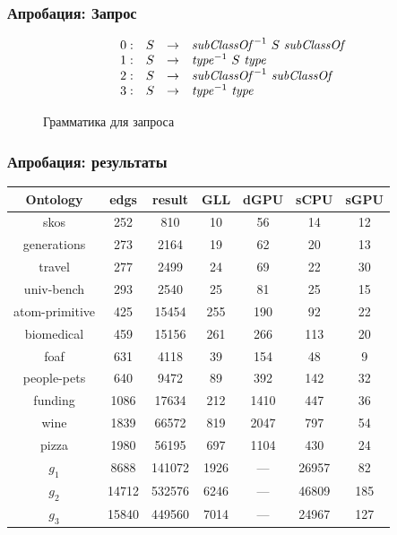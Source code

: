 \documentclass{beamer}
\begin{document}
\begin{frame}[fragile]
	\transwipe[direction=90]
	\frametitle{Апробация: Запрос}
\begin{figure}[h]
   \[
\begin{array}{rccl}
   0: & S & \rightarrow & \text{\textit{subClassOf}}^{-1} \ S \ \text{\textit{subClassOf}} \\ 
   1: & S & \rightarrow & \text{\textit{type}}^{-1} \ S \ \text{\textit{type}} \\ 
   2: & S & \rightarrow & \text{\textit{subClassOf}}^{-1} \ \text{\textit{subClassOf}} \\ 
   3: & S & \rightarrow & \text{\textit{type}}^{-1} \ \text{\textit{type}} \\ 
\end{array}
\]
\caption{Грамматика для запроса}
\label{ProductionRulesQuery1}
\end{figure}
\end{frame}

\begin{frame}[fragile]
  \transwipe[direction=90]
  \frametitle{Апробация: результаты}
\begin{center}
\begin{tabular}{ | c | c | c | c | c | c | c |}
\hline
Ontology & edgs & result & GLL & dGPU & sCPU & sGPU \\
\hline 
\hline
skos        & 252 & 810 & 10 & 56 & 14 & 12\\
generations & 273 & 2164 & 19 & 62 & 20 & 13\\
travel      & 277 & 2499 & 24 & 69 & 22 & 30\\
univ-bench  & 293 & 2540 & 25 & 81 & 25 & 15\\
atom-primitive & 425 & 15454 & 255 & 190 & 92 & 22\\
biomedical & 459 & 15156 & 261 & 266 & 113 & 20\\
foaf        & 631 & 4118 & 39 & 154 & 48 & 9\\
people-pets & 640 & 9472 & 89 & 392 & 142 & 32\\
funding     & 1086 & 17634 & 212 & 1410 & 447 & 36\\
wine        & 1839 & 66572 & 819 & 2047 & 797 & 54\\
pizza       & 1980 & 56195 & 697 & 1104 & 430 & 24\\
$g_{1}$     & 8688 & 141072 & 1926 & --- & 26957 & 82\\
$g_{2}$     & 14712 & 532576 & 6246 & --- & 46809 & 185\\
$g_{3}$     & 15840 & 449560 & 7014 & --- & 24967 & 127\\
\hline
\end{tabular}
\end{center}  
\end{frame}
\end{document}
